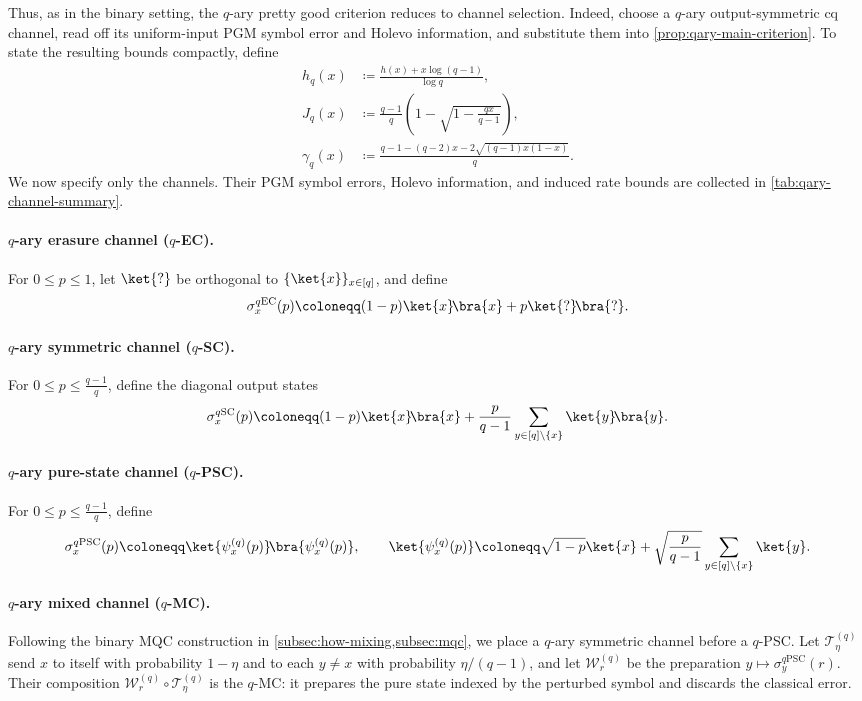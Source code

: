 \documentclass[11pt]{article}
\renewcommand{\leq}{\leqslant}
\theoremstyle{remark}
\newcommand{\ketbra}[2]{\ket{#1}\!\bra{#2}}
\begin{document}
Thus, as in the binary setting, the $q$-ary pretty good criterion reduces to channel selection. Indeed, choose a $q$-ary output-symmetric cq channel, read off its uniform-input PGM symbol error and Holevo information, and substitute them into \cref{prop:qary-main-criterion}. To state the resulting bounds compactly, define
\begin{align*}
h_q(x)
&\coloneqq \frac{h(x)+x\log(q-1)}{\log{q}}, \\
J_q(x)
&\coloneqq \frac{q-1}{q}\left(1-\sqrt{1-\frac{qx}{q-1}}\right), \\
\gamma_q(x)
&\coloneqq \frac{q-1-(q-2)x-2\sqrt{(q-1)x(1-x)}}{q}.
\end{align*}
We now specify only the channels. Their PGM symbol errors, Holevo information, and induced rate bounds are collected in \cref{tab:qary-channel-summary}.

\paragraph{$q$-ary erasure channel ($q$-EC).} For $0 \leq p \leq 1$, let $\ket{?}$ be orthogonal to $\{\ket{x}\}_{x \in [q]}$, and define
\begin{equation*}
\sigma_x^{q\mathrm{EC}}(p)
\coloneqq
(1-p)\ketbra{x}{x}+p\ketbra{?}{?}.
\end{equation*}

\paragraph{$q$-ary symmetric channel ($q$-SC).} For $0 \leq p \leq \frac{q-1}{q}$, define the diagonal output states
\begin{equation*}
\sigma_x^{q\mathrm{SC}}(p)
\coloneqq
(1-p)\ketbra{x}{x}
+\frac{p}{q-1}\sum_{y \in [q] \setminus \{x\}}{\ketbra{y}{y}}.
\end{equation*}

\paragraph{$q$-ary pure-state channel ($q$-PSC).} For $0 \leq p \leq \frac{q-1}{q}$, define
\begin{equation*}
\sigma_x^{q\mathrm{PSC}}(p)
\coloneqq
\ketbra{\psi_x^{(q)}(p)}{\psi_x^{(q)}(p)},
\qquad
\ket{\psi_x^{(q)}(p)}
\coloneqq
\sqrt{1-p}\ket{x}
+\sqrt{\frac{p}{q-1}}\sum_{y \in [q] \setminus \{x\}}{\ket{y}}.
\end{equation*}

\paragraph{$q$-ary mixed channel ($q$-MC).} Following the binary MQC construction in \cref{subsec:how-mixing,subsec:mqc}, we place a $q$-ary symmetric channel before a $q$-PSC. Let $\mathcal{T}^{(q)}_\eta$ send $x$ to itself with probability $1-\eta$ and to each $y \neq x$ with probability $\eta/(q-1)$, and let $\mathcal{W}^{(q)}_r$ be the preparation $y \mapsto \sigma_y^{q\mathrm{PSC}}(r)$. Their composition $\mathcal{W}^{(q)}_r \circ \mathcal{T}^{(q)}_\eta$ is the $q$-MC: it prepares the pure state indexed by the perturbed symbol and discards the classical error.
\end{document}
